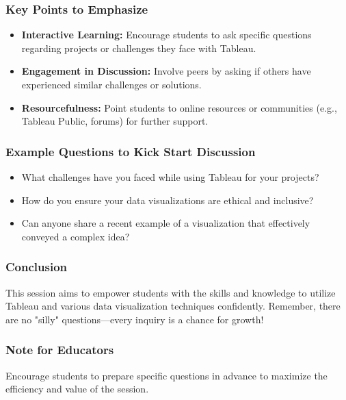 \documentclass[aspectratio=169]{beamer}
\begin{document}
\begin{frame}[fragile]
    \frametitle{Key Points to Emphasize}
    \begin{itemize}
        \item \textbf{Interactive Learning:} Encourage students to ask specific questions regarding projects or challenges they face with Tableau.
        \item \textbf{Engagement in Discussion:} Involve peers by asking if others have experienced similar challenges or solutions.
        \item \textbf{Resourcefulness:} Point students to online resources or communities (e.g., Tableau Public, forums) for further support.
    \end{itemize}
\end{frame}

\begin{frame}[fragile]
    \frametitle{Example Questions to Kick Start Discussion}
    \begin{itemize}
        \item What challenges have you faced while using Tableau for your projects?
        \item How do you ensure your data visualizations are ethical and inclusive?
        \item Can anyone share a recent example of a visualization that effectively conveyed a complex idea?
    \end{itemize}
\end{frame}

\begin{frame}[fragile]
    \frametitle{Conclusion}
    \begin{block}{}
        This session aims to empower students with the skills and knowledge to utilize Tableau and various data visualization techniques confidently. Remember, there are no "silly" questions—every inquiry is a chance for growth!
    \end{block}
\end{frame}

\begin{frame}[fragile]
    \frametitle{Note for Educators}
    \begin{block}{}
        Encourage students to prepare specific questions in advance to maximize the efficiency and value of the session.
    \end{block}
\end{frame}
\end{document}
